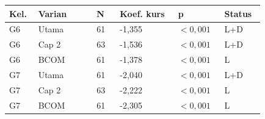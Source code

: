 {\small\setlength{\tabcolsep}{3pt}\renewcommand{\arraystretch}{1.15}
\begin{tabular}{p{0.08\linewidth}p{0.2\linewidth}p{0.08\linewidth}p{0.2\linewidth}p{0.15\linewidth}p{0.12\linewidth}}
\toprule
\textbf{Kel.} & \textbf{Varian} & \textbf{N} & \textbf{Koef. kurs} & \textbf{p} & \textbf{Status}\\
\midrule
G6 & Utama & 61 & -1,355 & \(<0{,}001\) & L+D\\
G6 & Cap 2 & 63 & -1,536 & \(<0{,}001\) & L+D\\
G6 & BCOM & 61 & -1,378 & \(<0{,}001\) & L\\
G7 & Utama & 61 & -2,040 & \(<0{,}001\) & L+D\\
G7 & Cap 2 & 63 & -2,222 & \(<0{,}001\) & L\\
G7 & BCOM & 61 & -2,305 & \(<0{,}001\) & L\\
\bottomrule
\end{tabular}
}